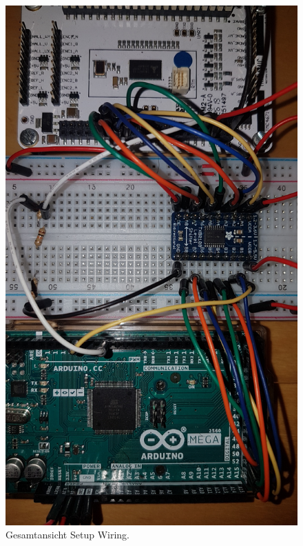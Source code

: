 \begin{appendix}
\begin{figure}[h!]
	\centering
	\includegraphics[angle=180,width=\textwidth]{graphics/2_komplett2}
	\caption{Gesamtansicht Setup Wiring.}
	\label{fig:1_komplett}
\end{figure}

\newpage


\end{appendix}
